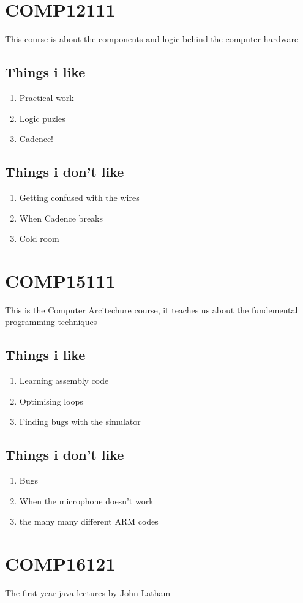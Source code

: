 \documentclass[a4paper]{article}
\begin{document}
\section{COMP12111}
This course is about the components and logic behind the computer hardware
\subsection{Things i like}
\begin{enumerate}
  \item Practical work
  \item Logic puzles
  \item Cadence!
\end{enumerate}
\subsection{Things i don't like}
\begin{enumerate}
  \item Getting confused with the wires
  \item When Cadence breaks
  \item Cold room
\end{enumerate}
\section{COMP15111}
This is the Computer Arcitechure course, it teaches us about the fundemental
programming techniques
\subsection{Things i like}
\begin{enumerate}
  \item Learning assembly code
  \item Optimising loops
  \item Finding bugs with the simulator
\end{enumerate}
\subsection{Things i don't like}
\begin{enumerate}
  \item Bugs
  \item When the microphone doesn't work
  \item the many many different ARM codes
\end{enumerate}
\section{COMP16121}
The first year java lectures by John Latham
\end{document}
